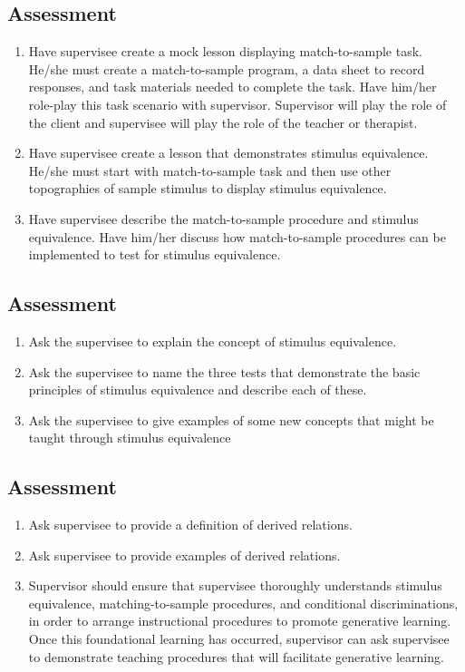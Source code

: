 \subsection{Assessment}
\begin{enumerate}
\item Have supervisee create a mock lesson displaying match-to-sample task. He/she must create a match-to-sample program, a data sheet to record responses, and task materials needed to complete the task. Have him/her role-play this task scenario with supervisor. Supervisor will play the role of the client and supervisee will play the role of the teacher or therapist.
\item Have supervisee create a lesson that demonstrates stimulus equivalence. He/she must start with match-to-sample task and then use other topographies of sample stimulus to display stimulus equivalence. 
\item Have supervisee describe the match-to-sample procedure and stimulus equivalence. Have him/her discuss how match-to-sample procedures can be implemented to test for stimulus equivalence. 
\end{enumerate}
%
\subsection{Assessment}
\begin{enumerate}
\item Ask the supervisee to explain the concept of stimulus equivalence.
\item Ask the supervisee to name the three tests that demonstrate the basic principles of stimulus equivalence and describe each of these.
\item Ask the supervisee to give examples of some new concepts that might be taught through stimulus equivalence
\end{enumerate}
%
\subsection{Assessment}
\begin{enumerate}
\item Ask supervisee to provide a definition of derived relations.
\item Ask supervisee to provide examples of derived relations.
\item Supervisor should ensure that supervisee thoroughly understands stimulus equivalence, matching-to-sample procedures, and conditional discriminations, in order to arrange instructional procedures to promote generative learning.  Once this foundational learning has occurred, supervisor can ask supervisee to demonstrate teaching procedures that will facilitate generative learning.
\end{enumerate}
%
